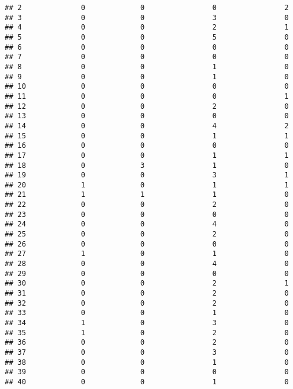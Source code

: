 \documentclass[
]{article}
\begin{document}
\begin{verbatim}
## 2              0             0                0                2
## 3              0             0                3                0
## 4              0             0                2                1
## 5              0             0                5                0
## 6              0             0                0                0
## 7              0             0                0                0
## 8              0             0                1                0
## 9              0             0                1                0
## 10             0             0                0                0
## 11             0             0                0                1
## 12             0             0                2                0
## 13             0             0                0                0
## 14             0             0                4                2
## 15             0             0                1                1
## 16             0             0                0                0
## 17             0             0                1                1
## 18             0             3                1                0
## 19             0             0                3                1
## 20             1             0                1                1
## 21             1             1                1                0
## 22             0             0                2                0
## 23             0             0                0                0
## 24             0             0                4                0
## 25             0             0                2                0
## 26             0             0                0                0
## 27             1             0                1                0
## 28             0             0                4                0
## 29             0             0                0                0
## 30             0             0                2                1
## 31             0             0                2                0
## 32             0             0                2                0
## 33             0             0                1                0
## 34             1             0                3                0
## 35             1             0                2                0
## 36             0             0                2                0
## 37             0             0                3                0
## 38             0             0                1                0
## 39             0             0                0                0
## 40             0             0                1                0

\end{verbatim}
\end{document}
